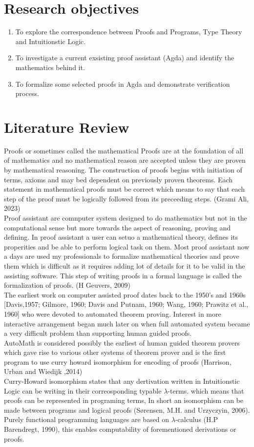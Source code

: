 \documentclass{article}
\begin{document}
\section{Research objectives}
\begin{enumerate}
    \item To explore the correspondence between Proofs and Programs, Type Theory and Intuitionstic Logic.
    \item To investigate a current exsisting proof assistant (Agda) and identify the mathematics behind it.
    \item To formalize some selected proofs in Agda and demonstrate verification process.
\end{enumerate}
\section{Literature Review}
\indent{}
Proofs or sometimes called the mathematical Proofs are at the foundation of all 
of mathematics and no mathematical reason are accepted unless they are proven by mathematical reasoning.
The construction of proofs begins with initiation of terms, axioms and may bed dependent on previously proven
theorems. Each statement in mathematical proofs must be correct which means to say that each step of the proof must be logically followed from its preceeding steps. (Grami Ali, 2023)\\
Proof assistant are comnputer system designed to do mathematics but not in the computational sense but more towards the aspect of reasoning, proving and defining.
In proof assistant a user can setuo a mathematical theory, defines its properities and be able to perform logical task on them.
Most proof assistant now a days are used my professionals to formalize mathematical theories and prove them which is difficult as it requires adding lot of details for it to be valid
in the assisting software. This step of writing proofs in a formal language is called the formalization of proofs. (H Geuvers, 2009)  \\ 
The earliest work on computer assisted proof dates back to the 1950's and 1960s 
[Davis,1957; Gilmore, 1960; Davis and Putnam, 1960; Wang, 1960; Prawitz et al., 1960] who were devoted to automated theorem proving. 
 Interest in more interactive arrangement began much later on when full automated system became a very difficult problem than supporting human guided proofs.\\
AutoMath is considered possibly the earliest of human guided theorem provers which gave rise to various other systems of theorem prover and is the first program to use curry howard isomorphism for encoding of proofs (Harrison, Urban and Wiedijk ,2014) \\
Curry-Howard isomorphism states that any dertivation written in Intuitionstic Logic can be writing in their correosponding typable $ \lambda$\hyp{}terms. which means that proofs can be represented in programing terms, In short an isomorphism can be made between programs and logical proofs (Sørensen, M.H. and Urzyczyin, 2006).
Purely functional programming languages are based on $\lambda$-calculus (H.P Barendregt, 1990), this enables computability of forementioned derivations or proofs. 
\end{document}
